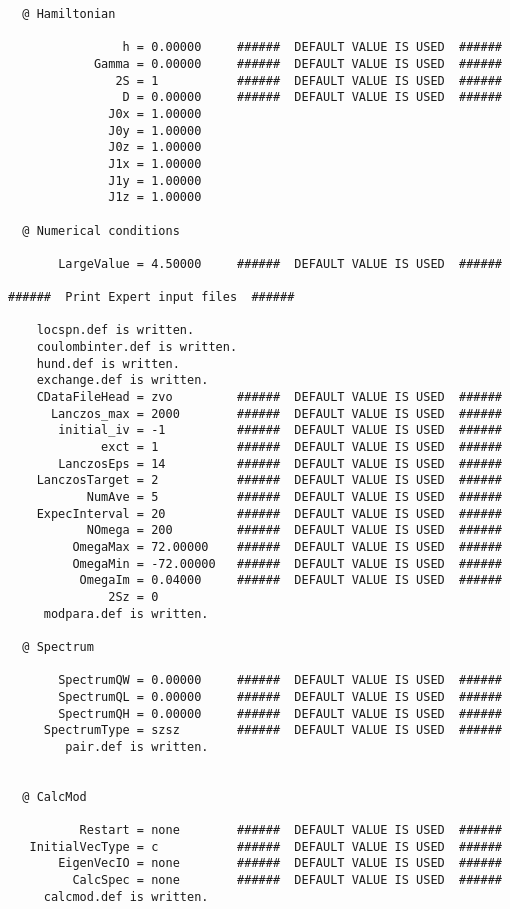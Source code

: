 \begin{verbatim}
  @ Hamiltonian

                h = 0.00000     ######  DEFAULT VALUE IS USED  ######
            Gamma = 0.00000     ######  DEFAULT VALUE IS USED  ######
               2S = 1           ######  DEFAULT VALUE IS USED  ######
                D = 0.00000     ######  DEFAULT VALUE IS USED  ######
              J0x = 1.00000
              J0y = 1.00000
              J0z = 1.00000
              J1x = 1.00000
              J1y = 1.00000
              J1z = 1.00000

  @ Numerical conditions

       LargeValue = 4.50000     ######  DEFAULT VALUE IS USED  ######

######  Print Expert input files  ######

    locspn.def is written.
    coulombinter.def is written.
    hund.def is written.
    exchange.def is written.
    CDataFileHead = zvo         ######  DEFAULT VALUE IS USED  ######
      Lanczos_max = 2000        ######  DEFAULT VALUE IS USED  ######
       initial_iv = -1          ######  DEFAULT VALUE IS USED  ######
             exct = 1           ######  DEFAULT VALUE IS USED  ######
       LanczosEps = 14          ######  DEFAULT VALUE IS USED  ######
    LanczosTarget = 2           ######  DEFAULT VALUE IS USED  ######
           NumAve = 5           ######  DEFAULT VALUE IS USED  ######
    ExpecInterval = 20          ######  DEFAULT VALUE IS USED  ######
           NOmega = 200         ######  DEFAULT VALUE IS USED  ######
         OmegaMax = 72.00000    ######  DEFAULT VALUE IS USED  ######
         OmegaMin = -72.00000   ######  DEFAULT VALUE IS USED  ######
          OmegaIm = 0.04000     ######  DEFAULT VALUE IS USED  ######
              2Sz = 0
     modpara.def is written.

  @ Spectrum

       SpectrumQW = 0.00000     ######  DEFAULT VALUE IS USED  ######
       SpectrumQL = 0.00000     ######  DEFAULT VALUE IS USED  ######
       SpectrumQH = 0.00000     ######  DEFAULT VALUE IS USED  ######
     SpectrumType = szsz        ######  DEFAULT VALUE IS USED  ######
        pair.def is written.


  @ CalcMod

          Restart = none        ######  DEFAULT VALUE IS USED  ######
   InitialVecType = c           ######  DEFAULT VALUE IS USED  ######
       EigenVecIO = none        ######  DEFAULT VALUE IS USED  ######
         CalcSpec = none        ######  DEFAULT VALUE IS USED  ######
     calcmod.def is written.


\end{verbatim}
